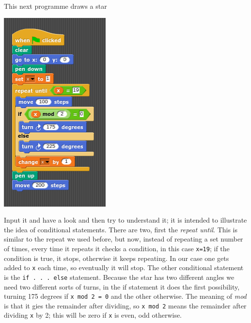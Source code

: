 \documentclass[11pt,a4paper]{scrartcl}
\begin{document}
This next programme draws a star
\begin{center}
\includegraphics{star.png}
\end{center}
Input it and have a look and then try to understand it; it is intended
to illustrate the idea of conditional statements. There are two, first
the \textsl{repeat until}. This is similar to the repeat we used
before, but now, instead of repeating a set number of times, every
time it repeats it checks a condition, in this case \texttt{x=19}; if
the condition is true, it stops, otherwise it keeps repeating. In our
case one gets added to \texttt{x} each time, so eventually it will
stop. The other conditional statement is the \texttt{if . . . else}
statement. Because the star has two different angles we need two
different sorts of turns, in the if statement it does the first
possibility, turning 175 degrees if \texttt{x mod 2 = 0} and the other
otherwise. The meaning of \textsl{mod} is that it gies the remainder
after dividing, so \texttt{x mod 2} means the remainder after dividing
\texttt{x} by 2; this will be zero if \texttt{x} is even, odd
otherwise. 
\end{document}
